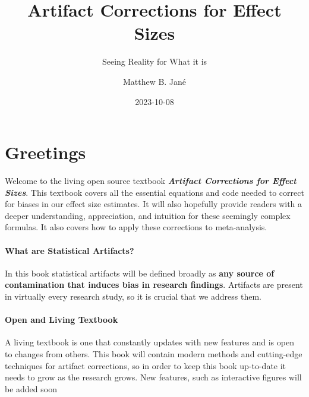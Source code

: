 \documentclass[
  letterpaper,
  DIV=11,
  numbers=noendperiod]{scrreprt}
\title{Artifact Corrections for Effect Sizes}
\subtitle{Seeing Reality for What it is}
\author{Matthew B. Jané}
\date{2023-10-08}
\renewcommand*\contentsname{Table of contents}
\newcommand\contentsname{Table of contents}
\begin{document}
\maketitle
\ifdefined\Shaded\renewenvironment{Shaded}{\begin{tcolorbox}[frame hidden, boxrule=0pt, sharp corners, colback={codebgcolor}, borderline west={3pt}{0pt}{shadecolor}, enhanced, breakable]}{\end{tcolorbox}}\fi

\renewcommand*\contentsname{Table of contents}
{
\hypersetup{linkcolor=}
\setcounter{tocdepth}{2}
\tableofcontents
}

\hypertarget{greetings}{%
\chapter{Greetings}\label{greetings}}

Welcome to the living open source textbook \textbf{\emph{Artifact
Corrections for Effect Sizes}}. This textbook covers all the essential
equations and code needed to correct for biases in our effect size
estimates. It will also hopefully provide readers with a deeper
understanding, appreciation, and intuition for these seemingly complex
formulas. It also covers how to apply these corrections to
meta-analysis.

\hypertarget{what-are-statistical-artifacts}{%
\subsubsection*{What are Statistical
Artifacts?}\label{what-are-statistical-artifacts}}

In this book statistical artifacts will be defined broadly as
\textbf{any source of contamination that induces bias in research
findings}. Artifacts are present in virtually every research study, so
it is crucial that we address them.

\hypertarget{open-and-living-textbook}{%
\subsubsection*{Open and Living
Textbook}\label{open-and-living-textbook}}

A living textbook is one that constantly updates with new features and
is open to changes from others. This book will contain modern methods
and cutting-edge techniques for artifact corrections, so in order to
keep this book up-to-date it needs to grow as the research grows. New
features, such as interactive figures will be added soon
\end{document}

